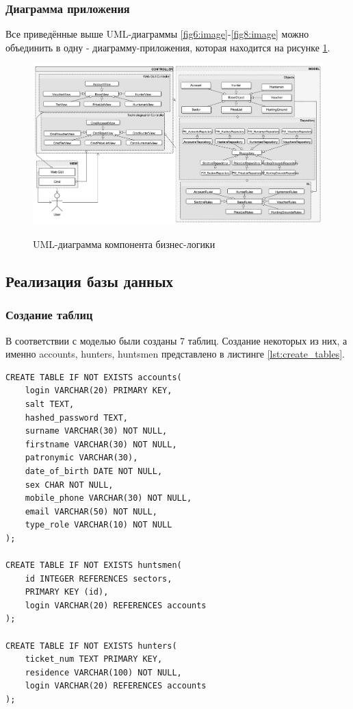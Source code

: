 		\subsubsection{Диаграмма приложения}
		Все приведённые выше UML-диаграммы \ref{fig6:image}-\ref{fig8:image} можно объединить в одну - диаграмму-приложения, которая находится на рисунке \ref{fig9:image}.
		
		\begin{figure}[ph!]
			\centering
			\begin{center}
				{\includegraphics[scale=0.44, angle=90]{schemes/uml_full.pdf}}
				\caption{UML-диаграмма компонента бизнес-логики}
				\label{fig9:image}
			\end{center}
		\end{figure}
	\newpage
	
	\subsection{Реализация базы данных}	
		\subsubsection{Создание таблиц}
		В соответствии с моделью были созданы 7 таблиц. Создание некоторых из них, а именно accounts, hunters, huntsmen представлено в листинге \ref{lst:create_tables}.
		
		\begin{lstlisting}[caption = {Создание некоторых таблиц}, label=lst:create_tables]
CREATE TABLE IF NOT EXISTS accounts(
	login VARCHAR(20) PRIMARY KEY,
	salt TEXT,
	hashed_password TEXT,
	surname VARCHAR(30) NOT NULL,
	firstname VARCHAR(30) NOT NULL,
	patronymic VARCHAR(30),
	date_of_birth DATE NOT NULL,
	sex CHAR NOT NULL,
	mobile_phone VARCHAR(30) NOT NULL,
	email VARCHAR(50) NOT NULL,
	type_role VARCHAR(10) NOT NULL
);

CREATE TABLE IF NOT EXISTS huntsmen(
	id INTEGER REFERENCES sectors,
	PRIMARY KEY (id),
	login VARCHAR(20) REFERENCES accounts
);

CREATE TABLE IF NOT EXISTS hunters(
	ticket_num TEXT PRIMARY KEY,
	residence VARCHAR(100) NOT NULL,
	login VARCHAR(20) REFERENCES accounts
);
		\end{lstlisting}
	
